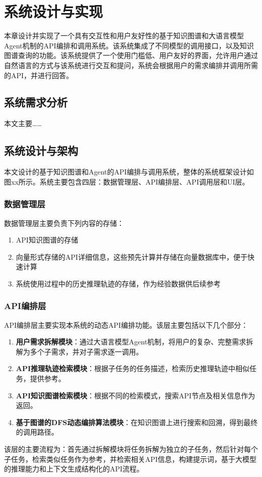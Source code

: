 
\chapter{系统设计与实现}

本章设计并实现了一个具有交互性和用户友好性的基于知识图谱和大语言模型Agent机制的API编排和调用系统。该系统集成了不同模型的调用接口，以及知识图谱查询的功能。该系统提供了一个使用门槛低、用户友好的界面，允许用户通过自然语言的方式与该系统进行交互和提问，系统会根据用户的需求编排并调用所需的API，并进行回答。

\section{系统需求分析}
本文主要……

\section{系统设计与架构}
本文设计的基于知识图谱和Agent的API编排与调用系统，整体的系统框架设计如图xx所示。系统主要包含四层：数据管理层、API编排层、API调用层和UI层。

\subsection{数据管理层}
数据管理层主要负责下列内容的存储：
\begin{enumerate}
    \item API知识图谱的存储
    \item 向量形式存储的API详细信息，这些预先计算并存储在向量数据库中，便于快速计算
    \item 系统使用过程中的历史推理轨迹的存储，作为经验数据供后续参考
\end{enumerate}

\subsection{API编排层}
API编排层主要实现本系统的动态API编排功能。该层主要包括以下几个部分：
\begin{enumerate}
    \item \textbf{用户需求拆解模块}：通过大语言模型Agent机制，将用户的复杂、完整需求拆解为多个子需求，并对子需求逐一调用。
    \item \textbf{API推理轨迹检索模块}：根据子任务的任务描述，检索历史推理轨迹中相似任务，提供参考。
    \item \textbf{API知识图谱检索模块}：根据不同的检索模式，搜索API节点及相关信息作为返回。
    \item \textbf{基于图谱的DFS动态编排算法模块}：在知识图谱上进行搜索和回溯，得到最终的调用路径。
\end{enumerate}
该层的主要流程为：首先通过拆解模块将任务拆解为独立的子任务，然后针对每个子任务，检索类似任务作为参考，并检索相关API信息，构建提示词，基于大模型的推理能力和上下文生成结构化的API流程。

